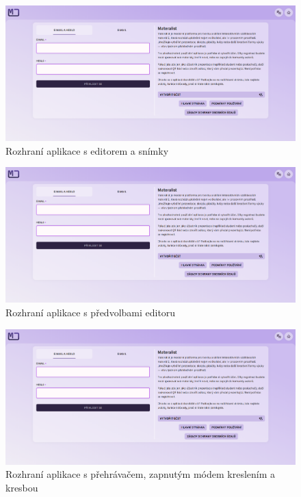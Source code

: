 \begin{figure}[ht!]
    \centering
    \includegraphics[width=1\textwidth,page=3]{media/appendix/uzivatelskeProstredi.pdf}
    \caption{Rozhraní aplikace s editorem a snímky}
\end{figure}
\begin{figure}[ht!]
    \centering
    \includegraphics[width=1\textwidth,page=4]{media/appendix/uzivatelskeProstredi.pdf}
    \caption{Rozhraní aplikace s předvolbami editoru}
\end{figure}

\begin{figure}[ht!]
    \centering
    \includegraphics[width=1\textwidth,page=5]{media/appendix/uzivatelskeProstredi.pdf}
    \caption{Rozhraní aplikace s přehrávačem, zapnutým módem kreslením a kresbou}
\end{figure}


